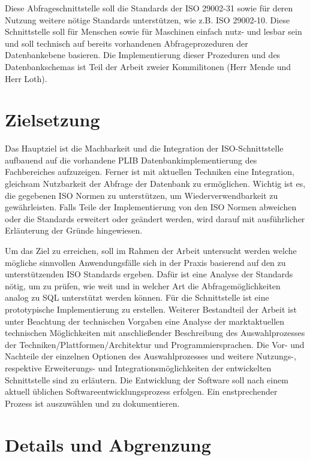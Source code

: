Diese Abfrageschnittstelle soll die Standards der ISO 29002-31 sowie für deren Nutzung weitere nötige Standards unterstützen, wie z.B. ISO 29002-10. Diese Schnittstelle soll für Menschen sowie für Maschinen einfach nutz- und lesbar sein und soll technisch auf bereits vorhandenen Abfrageprozeduren der Datenbankebene basieren. Die Implementierung dieser Prozeduren und des Datenbankschemas ist Teil der Arbeit zweier Kommilitonen (Herr Mende und Herr Loth).

\section{Zielsetzung}

Das Hauptziel ist die Machbarkeit und die Integration der ISO-Schnittstelle aufbauend auf die vorhandene PLIB Datenbankimplementierung des Fachbereiches aufzuzeigen. 
Ferner ist mit aktuellen Techniken eine Integration, gleichsam Nutzbarkeit der Abfrage der Datenbank zu ermöglichen. Wichtig ist es, die gegebenen ISO Normen zu unterstützen, um Wiederverwendbarkeit zu gewährleisten. Falls Teile der Implementierung von den ISO Normen abweichen oder die Standards erweitert oder geändert werden, wird darauf mit ausführlicher Erläuterung der Gründe hingewiesen. 

Um das Ziel zu erreichen, soll im Rahmen der Arbeit untersucht werden welche mögliche sinnvollen Anwendungsfälle sich in der Praxis basierend auf den zu unterstützenden ISO Standards ergeben. Dafür ist eine Analyse der Standards nötig, um zu prüfen, wie weit und in welcher Art die Abfragemöglichkeiten analog zu SQL unterstützt werden können. Für die Schnittstelle ist eine prototypische Implementierung zu erstellen. Weiterer Bestandteil der Arbeit ist unter Beachtung der technischen Vorgaben eine Analyse der marktaktuellen technischen Möglichkeiten mit anschließender Beschreibung des Auswahlprozesses der Techniken/Plattformen/Architektur und Programmiersprachen. Die Vor- und Nachteile der einzelnen Optionen des Auswahlprozesses und weitere Nutzungs-, respektive Erweiterungs- und Integrationsmöglichkeiten der entwickelten Schnittstelle sind zu erläutern. 
Die Entwicklung der Software soll nach einem aktuell üblichen Softwareentwicklungsprozess erfolgen. Ein enstprechender Prozess ist auszuwählen und zu dokumentieren. 

\section{Details und Abgrenzung}

